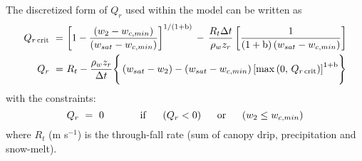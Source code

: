 The discretized form of $Q_r$ used within the model can be written as
%
%
\begin{subequations}
\begin{align}
\label{qrc}
Q_{r\,{\rm crit}} \,\,=\,\, &
{\left[1 - {\left(w_2-w_{c,min}\right)\over 
\left(w_{sat}-w_{c,min}\right)}\right]}^{1/(1+{\rm b})}
\,-\,
{R_t \Delta t \over \rho_w z_r}
\left[{ 1\over
(1+{\rm b})\left(w_{sat}-w_{c,min}\right)
}\right]
\\
\label{qr}
Q_r \,\,=\,\, & R_t - {\rho_w z_r \over\Delta t}
\Biggr\lbrace
\left(w_{sat}-w_2\right)-
\left(w_{sat}-w_{c,min}\right) 
{\left[{\rm max}\left(0,\,Q_{r\,{\rm crit}}\right)\right]}^{1+{\rm b}}
\Biggr\rbrace
\end{align}
\end{subequations}
%
with the constraints:
%
\begin{equation}
\label{qrz}
Q_r \,\,=\,\, 0
\hskip.5in
{\rm if}\hskip.2in
\left(Q_r < 0 \right) 
\hskip.2in {\rm or}\hskip.2in 
\left(w_2 \leq w_{c,min}\right) 
\end{equation}
%
where $R_t$
(m s$^{-1}$) is the through-fall rate (sum of canopy drip, precipitation
and snow-melt). 


